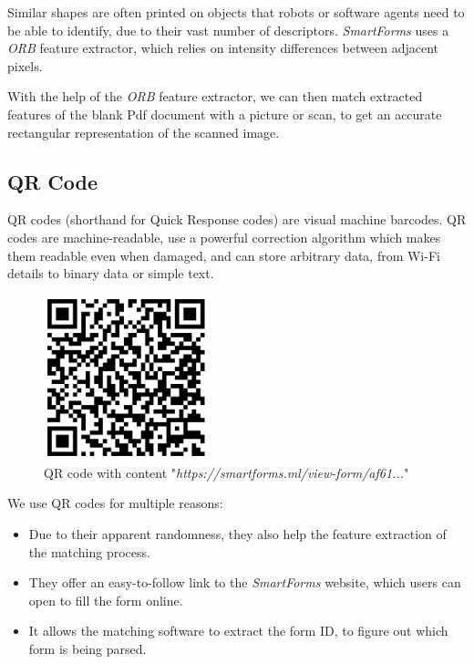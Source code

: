 \documentclass[11pt, a4paper]{report}
\begin{document}
Similar shapes are often printed on objects that robots or software agents need to be able to identify, due to their vast number of descriptors. \textit{SmartForms} uses a \textit{ORB} feature extractor\cite{rublee2011orb}, which relies on intensity differences between adjacent pixels.

With the help of the \textit{ORB} feature extractor, we can then match extracted features of the blank Pdf document with a picture or scan, to get an accurate rectangular representation of the scanned image.

\subsection{QR Code}

QR codes (shorthand for Quick Response codes) are visual machine barcodes. QR codes are machine-readable, use a powerful correction algorithm\cite{wicker1999reed} which makes them readable even when damaged, and can store arbitrary data, from Wi-Fi details to binary data or simple text.

\begin{figure}[!h]
    \centering
    \includegraphics[width=13em]{images/screenshoots/sample-qr-code.png}
    \caption{QR code with content "\textit{https://smartforms.ml/view-form/af61...}"}
    \label{qr-code-image}
\end{figure}

We use QR codes for multiple reasons:
\begin{itemize}
    \item Due to their apparent randomness, they also help the feature extraction of the matching process.
    \item They offer an easy-to-follow link to the \textit{SmartForms} website, which users can open to fill the form online.
    \item It allows the matching software to extract the form ID, to figure out which form is being parsed.
\end{itemize}
\end{document}
